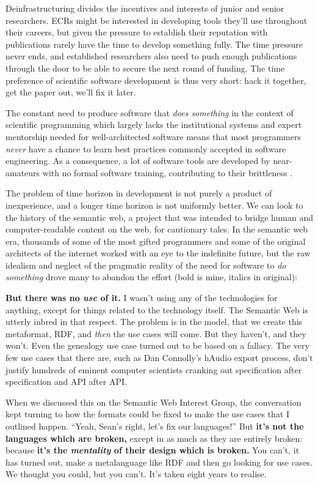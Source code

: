Deinfrastructuring divides the incentives and interests of junior and
senior researchers. ECRs might be interested in developing tools they'll
use throughout their careers, but given the pressure to establish their
reputation with publications rarely have the time to develop something
fully. The time pressure never ends, and established researchers also
need to push enough publications through the door to be able to secure
the next round of funding. The time preference of scientific software
development is thus very short: hack it together, get the paper out,
we'll fix it later.

The constant need to produce software that \emph{does something} in the
context of scientific programming which largely lacks the institutional
systems and expert mentorship needed for well-architected software means
that most programmers \emph{never} have a chance to learn best practices
commonly accepted in software engineering. As a consequence, a lot of
software tools are developed by near-amateurs with no formal software
training, contributing to their brittleness \citep{altschulAnatomySuccessfulComputational2013} .

The problem of time horizon in development is not purely a product of
inexperience, and a longer time horizon is not uniformly better. We can
look to the history of the semantic web, a project that was intended to
bridge human and computer-readable content on the web, for cautionary
tales. In the semantic web era, thousands of some of the most gifted
programmers and some of the original architects of the internet worked
with an eye to the indefinite future, but the raw idealism and neglect
of the pragmatic reality of the need for software to \emph{do something}
drove many to abandon the effort (bold is mine, italics in original):

\begin{leftbar}
\textbf{But there was no \emph{use} of it.} I wasn't using any of the
technologies for anything, except for things related to the technology
itself. The Semantic Web is utterly inbred in that respect. The problem
is in the model, that we create this metaformat, RDF, and \emph{then}
the use cases will come. But they haven't, and they won't. Even the
genealogy use case turned out to be based on a fallacy. The very few use
cases that there are, such as Dan Connolly's hAudio export process,
don't justify hundreds of eminent computer scientists cranking out
specification after specification and API after API.

When we discussed this on the Semantic Web Interest Group, the
conversation kept turning to how the formats could be fixed to make the
use cases that I outlined happen. ``Yeah, Sean's right, let's fix our
languages!'' But \textbf{it's not the languages which are broken,}
except in as much as they are entirely broken: because \textbf{it's the
\emph{mentality} of their design which is broken.} You can't, it has
turned out, make a metalanguage like RDF and then go looking for use
cases. We thought you could, but you can't. It's taken eight years to
realise. \citep{palmerDitchingSemanticWeb2008} 
\end{leftbar}

